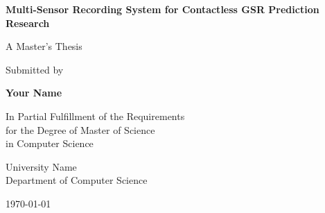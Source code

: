 \documentclass[12pt,a4paper]{report}
\begin{document}
\begin{titlepage}
\centering
\vspace*{2cm}

{\LARGE\textbf{Multi-Sensor Recording System for Contactless GSR Prediction Research}}

\vspace{1.5cm}

{\Large A Master's Thesis}

\vspace{1cm}

{\large Submitted by}

\vspace{0.5cm}

{\Large\textbf{Your Name}}

\vspace{2cm}

{\large In Partial Fulfillment of the Requirements\\
for the Degree of Master of Science\\
in Computer Science}

\vspace{2cm}

{\large University Name\\
Department of Computer Science}

\vspace{1cm}

{\large \today}

\end{titlepage}

\begin{abstract}
This thesis presents a comprehensive multi-sensor recording system designed for contactless Galvanic Skin Response (GSR) prediction research. The system integrates multiple sensing modalities including thermal imaging, RGB cameras, and environmental sensors to enable non-intrusive stress monitoring. The work addresses fundamental challenges in physiological computing by developing a robust, offline-first recording platform that supports distributed sensor networks and real-time data synchronization.

Key contributions include: (1) a distributed recording architecture supporting multiple sensor types, (2) contactless GSR prediction algorithms utilizing computer vision and thermal analysis, (3) comprehensive validation studies comparing contactless predictions with traditional contact-based measurements, and (4) open-source implementation enabling reproducible research in physiological computing.

The system demonstrates significant potential for applications in human-computer interaction, health monitoring, and stress assessment while maintaining user comfort and ecological validity through completely non-intrusive measurement approaches.
\end{abstract}
\end{document}
